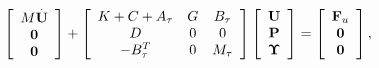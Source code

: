 \begin{frame}
\begin{itemize}
\begin{equation*}
\left[\begin{array}{c}
M\overset{.}{{\bf U}}\\
\mathbf{0}\\
\mathbf{0}
\end{array}\right]+\left[\begin{array}{ccc}
K+C+A_\tau&G&B_\tau\\
D&0&0\\
-B_\tau^T&0&M_\tau
\end{array}\right]\left[\begin{array}{c}
{\bf U}\\
{\bf P}\\
\boldsymbol{\Upsilon}
\end{array}\right]=\left[\begin{array}{c}
{\bf F}_u\\
\mathbf{0}\\
\mathbf{0}
\end{array}\right],
\end{equation*}
\end{itemize}
\end{frame}
